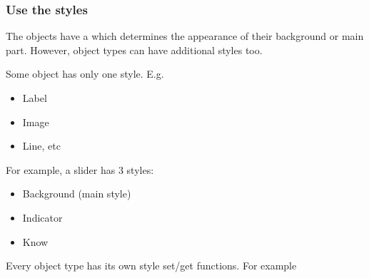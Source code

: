 \documentclass[letterpaper,10pt,english]{sphinxmanual}
\begin{document}
\begin{sphinxVerbatim}[commandchars=\\\{\}]
              
        
  
        
              

\end{sphinxVerbatim}


\subsubsection{Use the styles}
\label{\detokenize{overview/styles:use-the-styles}}
The objects have a  which determines the appearance of their background or main part. However, object types can have additional styles too.

Some object has only one style. E.g.
\begin{itemize}
\item {} 
Label

\item {} 
Image

\item {} 
Line, etc

\end{itemize}

For example, a slider has 3 styles:
\begin{itemize}
\item {} 
Background (main style)

\item {} 
Indicator

\item {} 
Know

\end{itemize}

Every object type has its own style set/get functions. For example

\begin{sphinxVerbatim}[commandchars=\\\{\}]
      
  
\end{sphinxVerbatim}
\end{document}
